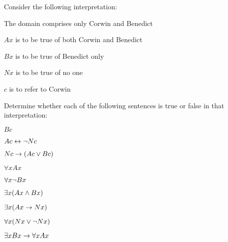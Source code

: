 %		


\practiceproblems
\solutions
\problempart
\label{pr.TorF1}
Consider the following interpretation:
	\begin{ebullet}
		\item The domain comprises only Corwin and Benedict
		\item $Ax$ is to be true of both Corwin and Benedict
		\item $Bx$ is to be true of Benedict only
		\item $Nx$ is to be true of no one
		\item $c$ is to refer to Corwin
	\end{ebullet}
Determine whether each of the following sentences is true or false in that interpretation:
\begin{earg}
\item $Bc$
\item $Ac \leftrightarrow \neg Nc$
\item $Nc \rightarrow (Ac \vee Bc)$
\item $\forall x Ax$
\item $\forall x \neg Bx$
\item $\exists x(Ax \wedge Bx)$
\item $\exists x(Ax \rightarrow Nx)$
\item $\forall x(Nx \vee \neg Nx)$
\item $\exists x Bx \rightarrow \forall x Ax$
\end{earg}

